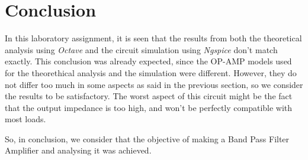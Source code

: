 \section{Conclusion}
\label{sec:conclusion}

In this laboratory assignment, it is seen that the results from both the theoretical analysis using \textit{Octave} and the circuit simulation using \textit{Ngspice} don't match exactly. This conclusion was already expected, since the OP-AMP models used for the theorethical analysis and the simulation were different. However, they do not differ too much in some aspects as said in the previous section, so we consider the results to be satisfactory. The worst aspect of this circuit might be the fact that the output impedance is too high, and won't be perfectly compatible with most loads. 
\par
So, in conclusion, we consider that the objective of making a Band Pass Filter Amplifier and analysing it was achieved. 
